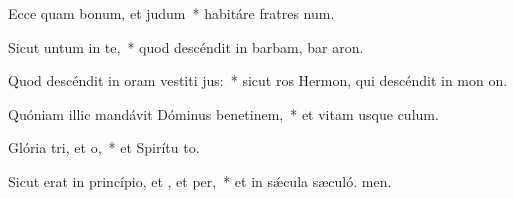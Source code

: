 \item Ecce quam bonum, et  judum~* habitáre fratres  num.
\item Sicut untum in te,~* quod descéndit in barbam, bar aron.
\item Quod descéndit in oram vestiti jus:~* sicut ros Hermon, qui descéndit in mon on.
\item Quóniam illic mandávit Dóminus benetinem,~* et vitam usque  culum.
\item Glória tri, et o,~* et Spirítu to.
\item Sicut erat in princípio, et , et per,~* et in sǽcula sæculó. men.
